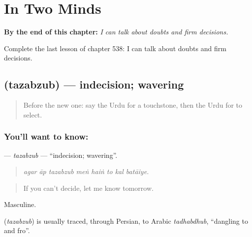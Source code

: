 
\chapter{In Two Minds}
\label{ch:ur-in-two-minds}

\begin{chapteropening}
\textbf{By the end of this chapter:} \emph{I can talk about doubts and firm decisions.}

Complete the last lesson of chapter 538: I can talk about doubts and firm decisions.
\end{chapteropening}

\section[\texorpdfstring{\ur{تذبذب} (tazabzub)}{تذبذب (tazabzub)}]{ (tazabzub) — indecision; wavering}

\label{lesson:UR-C538-tazabzub}



\begin{quote}
Before the new one: say the Urdu for a touchstone, then the Urdu for to select.
\end{quote}

\subsection*{You'll want to know: }
\textbf{} — \emph{tazabzub} — \textquotedblleft{}indecision; wavering\textquotedblright{}.

\begin{quote}
       
\end{quote}

\begin{quote}
\emph{agar āp tazabzub meṅ haiṅ to kal batāiye.}
\end{quote}

\begin{quote}
If you can't decide, let me know tomorrow.
\end{quote}

Masculine.

\begin{cousinweb}
\textbf{} (\emph{tazabzub}) is usually traced, through Persian, to Arabic \emph{tadhabdhub}, \textquotedblleft{}dangling to and fro\textquotedblright{}.
\end{cousinweb}

